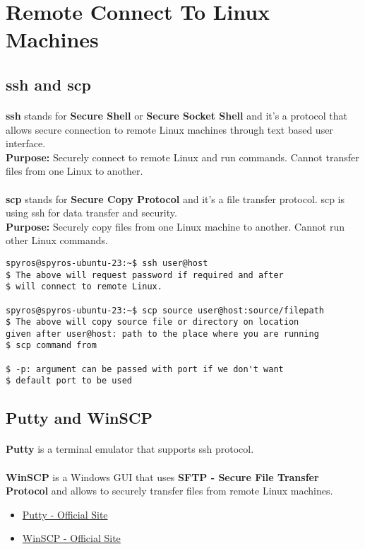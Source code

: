 \documentclass{article}
\begin{document}
\section{Remote Connect To Linux Machines}

\subsection{ssh and scp}
\paragraph{} \textbf{ssh} stands for \textbf{Secure Shell} or \textbf{Secure Socket Shell} and it's a protocol that allows secure connection to remote Linux machines through text based user interface.\\\textbf{Purpose:} Securely connect to remote Linux and run commands. Cannot transfer files from one Linux to another.
\paragraph{} \textbf{scp} stands for \textbf{Secure Copy Protocol} and it's a file transfer protocol. scp is using ssh for data transfer and security.\\\textbf{Purpose:} Securely copy files from one Linux machine to another. Cannot run other Linux commands.
\begin{lstlisting}
spyros@spyros-ubuntu-23:~$ ssh user@host
$ The above will request password if required and after
$ will connect to remote Linux.

spyros@spyros-ubuntu-23:~$ scp source user@host:source/filepath
$ The above will copy source file or directory on location
given after user@host: path to the place where you are running
$ scp command from

$ -p: argument can be passed with port if we don't want 
$ default port to be used
\end{lstlisting}

\subsection{Putty and WinSCP}
\paragraph{} \textbf{Putty} is a terminal emulator that supports ssh protocol.
\paragraph{} \textbf{WinSCP} is a Windows GUI that uses \textbf{SFTP - Secure File Transfer Protocol} and allows to securely transfer files from remote Linux machines.
\begin{itemize}
	\item \href{https://www.putty.org/}{Putty - Official Site}
	\item \href{https://winscp.net/eng/index.php}{WinSCP - Official Site}
\end{itemize}
\end{document}
